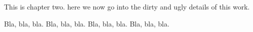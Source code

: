 
This is chapter two. here we now go into the dirty and ugly details
of this work.

Bla, bla, bla. Bla, bla, bla. Bla, bla, bla. Bla, bla, bla.
